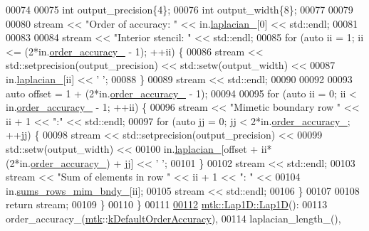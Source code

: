 \begin{DoxyCode}
00074 
00075   \textcolor{keywordtype}{int} output\_precision\{4\};
00076   \textcolor{keywordtype}{int} output\_width\{8\};
00077 
00079 
00080   stream << \textcolor{stringliteral}{"Order of accuracy: "} << in.\hyperlink{classmtk_1_1Lap1D_a64a3977527c00b4ef994d1bd549f82fd}{laplacian\_}[0] << std::endl;
00081 
00083 
00084   stream << \textcolor{stringliteral}{"Interior stencil: "} << std::endl;
00085   \textcolor{keywordflow}{for} (\textcolor{keyword}{auto} ii = 1; ii <= (2*in.\hyperlink{classmtk_1_1Lap1D_a35d34c085b9cf6f9961a699dfb02fea6}{order\_accuracy\_} - 1); ++ii) \{
00086     stream << std::setprecision(output\_precision) << std::setw(output\_width) <<
00087       in.\hyperlink{classmtk_1_1Lap1D_a64a3977527c00b4ef994d1bd549f82fd}{laplacian\_}[ii] << \textcolor{charliteral}{' '};
00088   \}
00089   stream << std::endl;
00090 
00092 
00093   \textcolor{keyword}{auto} offset = 1 + (2*in.\hyperlink{classmtk_1_1Lap1D_a35d34c085b9cf6f9961a699dfb02fea6}{order\_accuracy\_} - 1);
00094 
00095   \textcolor{keywordflow}{for} (\textcolor{keyword}{auto} ii = 0; ii < in.\hyperlink{classmtk_1_1Lap1D_a35d34c085b9cf6f9961a699dfb02fea6}{order\_accuracy\_} - 1; ++ii) \{
00096     stream << \textcolor{stringliteral}{"Mimetic boundary row "} << ii + 1 << \textcolor{stringliteral}{":"} << std::endl;
00097     \textcolor{keywordflow}{for} (\textcolor{keyword}{auto} jj = 0; jj < 2*in.\hyperlink{classmtk_1_1Lap1D_a35d34c085b9cf6f9961a699dfb02fea6}{order\_accuracy\_}; ++jj) \{
00098       stream << std::setprecision(output\_precision) <<
00099         std::setw(output\_width) <<
00100           in.\hyperlink{classmtk_1_1Lap1D_a64a3977527c00b4ef994d1bd549f82fd}{laplacian\_}[offset + ii*(2*in.\hyperlink{classmtk_1_1Lap1D_a35d34c085b9cf6f9961a699dfb02fea6}{order\_accuracy\_}) + jj] << \textcolor{charliteral}{' '};
00101     \}
00102     stream << std::endl;
00103     stream << \textcolor{stringliteral}{"Sum of elements in row "} << ii + 1 << \textcolor{stringliteral}{": "} <<
00104       in.\hyperlink{classmtk_1_1Lap1D_a81d34a48cead4d5a2358581b1ff44252}{sums\_rows\_mim\_bndy\_}[ii];
00105     stream << std::endl;
00106   \}
00107 
00108   \textcolor{keywordflow}{return} stream;
00109 \}
00110 \}
00111 
\hypertarget{mtk__lap__1d_8cc_source_l00112}{}\hyperlink{classmtk_1_1Lap1D_a6fc2aeea35d4dfa49f17e625411f5a70}{00112} \hyperlink{classmtk_1_1Lap1D_a6fc2aeea35d4dfa49f17e625411f5a70}{mtk::Lap1D::Lap1D}():
00113   order\_accuracy\_(\hyperlink{namespacemtk}{mtk}::\hyperlink{group__c01-roots_ga0d95560098eb36420511103637b6952f}{kDefaultOrderAccuracy}),
00114   laplacian\_length\_(),

\end{DoxyCode}
